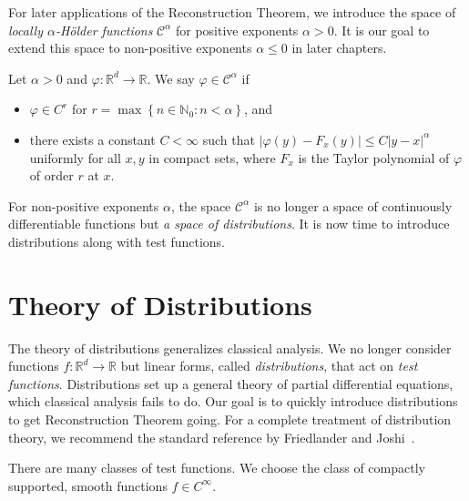 For later applications of the Reconstruction Theorem, we introduce the space of \emph{locally \({\alpha}\)-Hölder functions} \(\mathcal{C}^{\alpha}\) for positive exponents \(\alpha > 0\). It is our goal to extend this space to non-positive exponents \({\alpha \leq 0}\) in later chapters. 

\begin{definition}\label{definition:hoelder-functions}
    Let \(\alpha > 0\) and \(\varphi: \mathbb{R}^d \to \mathbb{R}\). We say \(\varphi \in \mathcal{C}^{\alpha}\) if
\begin{itemize}
    \item \(\varphi \in C^r\) for \(r = \max \left \{ n \in \mathbb{N}_0 : n < \alpha \right \} \), and
    \item there exists a constant \(C < {\infty}\) such that \(|\varphi(y) - F_x(y)| \leq C |y-x|^{\alpha}\) uniformly for all \(x,y\) in compact sets, where \(F_x\) is the Taylor polynomial of \({\varphi}\) of order \(r\) at \(x\).   
\end{itemize}
\end{definition}
For non-positive exponents \( \alpha \), the space \( \mathcal{C}^\alpha \) is no longer a space of continuously differentiable functions but \emph{a space of distributions}. It is now time to introduce distributions along with test functions.


\section{Theory of Distributions}\label{chapter:distributions}

The theory of distributions generalizes classical analysis. We no longer consider functions \( f : \mathbb{R}^d \to \mathbb{R} \) but linear forms, called \emph{distributions}, that act on \emph{test functions}. Distributions set up a general theory of partial differential equations, which classical analysis fails to do. Our goal is to quickly introduce distributions to get Reconstruction Theorem going. For a complete treatment of distribution theory, we recommend the standard reference by Friedlander and Joshi~\cite{friedlander1998introduction}.

There are many classes of test functions. We choose the class of compactly supported, smooth functions \( f \in C^\infty \).

